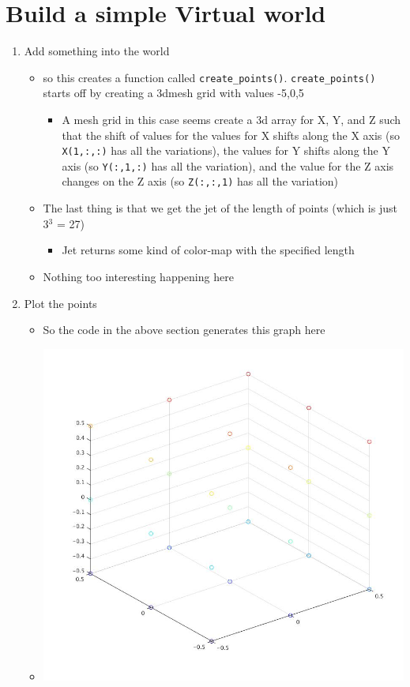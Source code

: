 \documentclass{article}
\begin{document}
\section{Build a simple Virtual world}
\label{sec-2}
\begin{enumerate}
\item Add something into the world
\label{sec-2-1}
\begin{itemize}
\item so this creates a function called
\texttt{create\_points()}. \texttt{create\_points()} starts off by creating a 3dmesh
grid with values -5,0,5
\begin{itemize}
\item A mesh grid in this case seems create a 3d array for X, Y, and Z
such that the shift of values for the values for X shifts along
the X axis (so \texttt{X(1,:,:)} has all the variations), the values for
Y shifts along the Y axis (so \texttt{Y(:,1,:)} has all the variation), and
the value for the Z axis changes on the Z axis (so \texttt{Z(:,:,1)} has
all the variation)
\end{itemize}
\item The last thing is that we get the jet of the length of points (which
is just 3$^{\text{3}}$ = 27)
\begin{itemize}
\item Jet returns some kind of color-map with the specified length
\end{itemize}
\item Nothing too interesting happening here
\end{itemize}
\item Plot the points
\label{sec-2-2}
\begin{itemize}
\item So the code in the above section generates this graph here
\item \includegraphics[width=.9\linewidth]{plot-the-points.jpg}

\end{itemize}
\end{enumerate}
\end{document}
